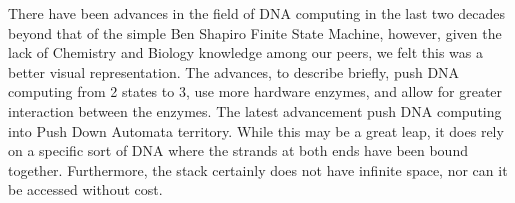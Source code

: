 \documentclass[sigconf]{acmart}
\begin{document}
There have been advances in the field of DNA computing in the last two decades beyond that of the simple Ben Shapiro Finite State Machine, however, given the lack of Chemistry and Biology knowledge among our peers, we felt this was a better visual representation. The advances, to describe briefly, push DNA computing from 2 states to 3, use more hardware enzymes, and allow for greater interaction between the enzymes. The latest advancement push DNA computing into Push Down Automata territory. While this may be a great leap, it does rely on a specific sort of DNA where the strands at both ends have been bound together. Furthermore, the stack certainly does not have infinite space, nor can it be accessed without cost. 
\end{document}

